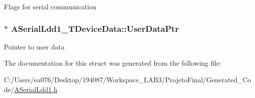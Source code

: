 Flags for serial communication \hypertarget{struct_a_serial_ldd1___t_device_data_a7fed00148f2be816d5e81f693ced1df7}{
\subsubsection[{User\-Data\-Ptr}]{$\ast$ A\-Serial\-Ldd1\-\_\-\-T\-Device\-Data\-::\-User\-Data\-Ptr}}\label{struct_a_serial_ldd1___t_device_data_a7fed00148f2be816d5e81f693ced1df7}
Pointer to user data 

The documentation for this struct was generated from the following file\-:\begin{DoxyCompactItemize}
\item 
C\-:/\-Users/ea076/\-Desktop/194087/\-Workspace\-\_\-\-L\-A\-B3/\-Projeto\-Final/\-Generated\-\_\-\-Code/\hyperlink{_a_serial_ldd1_8h}{A\-Serial\-Ldd1.\-h}\end{DoxyCompactItemize}
